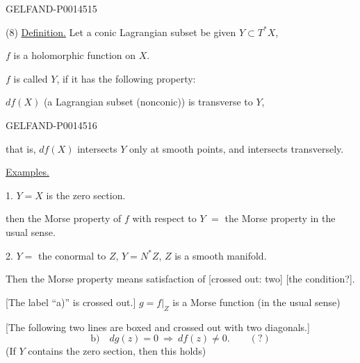 \begin{GelfandAdjacentEvidence}{GELFAND-P001451}{5}

(8) \uline{Definition.}
Let a conic Lagrangian subset be given \(Y\subset T^{*}X\),

\(f\) is a holomorphic function on \(X\).

\(f\) is called  \(Y\), if it has the following property:

\(df(X)\) (a Lagrangian subset (nonconic)) is transverse to \(Y\),
\end{GelfandAdjacentEvidence}
\begin{GelfandAdjacentEvidence}{GELFAND-P001451}{6}


that is, \(df(X)\) intersects \(Y\) only at smooth points, and intersects transversely.

\uline{Examples.}

1. \(Y=X\) is the zero section.

then the Morse property of \(f\) with respect to \(Y\) \(=\) the Morse property in the usual sense.

2. \(Y=\) the conormal to \(Z\), \(Y=N^{*}Z\), \(Z\) is a smooth manifold.

Then the Morse property means satisfaction of [crossed out: two] [the condition?].
\end{GelfandAdjacentEvidence}


[The label “a)” is crossed out.]
\(g=f|_Z\) is a Morse function (in the usual sense)

[The following two lines are boxed and crossed out with two diagonals.]
\[
\text{b)}\quad dg(z)=0\ \Rightarrow\ df(z)\ne0.\qquad (?)
\]
(If \(Y\) contains the zero section, then this holds)


